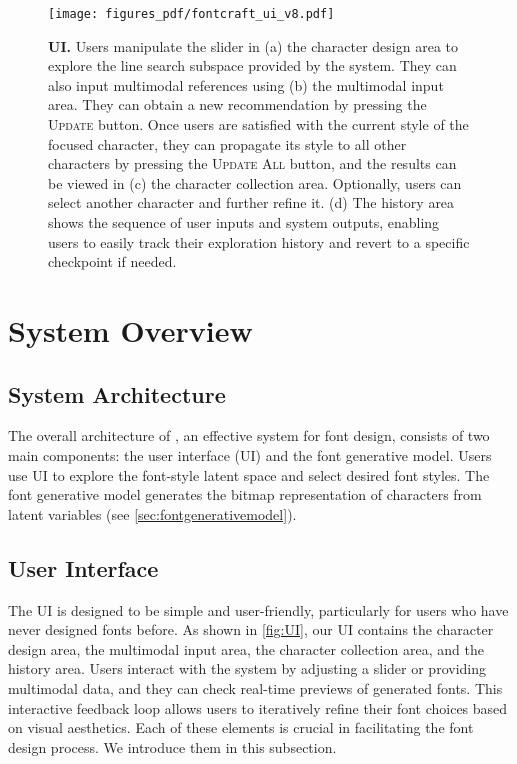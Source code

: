 \newcommand{\argmax}{\mathop{\rm arg~max}\limits}
\begin{figure*}[htb]
    \centering
    \texttt{[image: figures\_pdf/fontcraft\_ui\_v8.pdf]}
    \caption{
    \textbf{\systemName UI.}
    Users manipulate the slider in (a) the character design area to explore the line search subspace provided by the system.
    They can also input multimodal references using (b) the multimodal input area.
    They can obtain a new recommendation by pressing the \textsc{Update} button.
    Once users are satisfied with the current style of the focused character, they can propagate its style to all other characters by pressing the \textsc{Update All} button, and the results can be viewed in (c) the character collection area.
    Optionally, users can select another character and further refine it.
    (d) The history area shows the sequence of user inputs and system outputs, enabling users to easily track their exploration history and revert to a specific checkpoint if needed.
    }
    \label{fig:UI}
\end{figure*}

\section{\systemName System Overview}

\subsection{System Architecture}
The overall architecture of \systemName, an effective system for font design, consists of two main components: the user interface (UI) and the font generative model.
Users use UI to explore the font-style latent space and select desired font styles.
The font generative model generates the bitmap representation of characters from latent variables (see \autoref{sec:fontgenerativemodel}).

\subsection{User Interface}
The UI is designed to be simple and user-friendly, particularly for users who have never designed fonts before.
As shown in \autoref{fig:UI}, our UI contains the character design area, the multimodal input area, the character collection area, and the history area.
Users interact with the system by adjusting a slider or providing multimodal data, and they can check real-time previews of generated fonts.
This interactive feedback loop allows users to iteratively refine their font choices based on visual aesthetics.
Each of these elements is crucial in facilitating the font design process.
We introduce them in this subsection.

